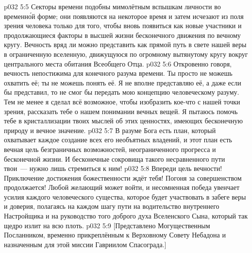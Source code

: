 \vs p032 5:5 Секторы времени подобны мимолётным вспышкам личности во временн\'ой форме; они появляются на некоторое время и затем исчезают из поля зрения человека только для того, чтобы вновь появиться как новые участники и продолжающиеся факторы в высшей жизни бесконечного движения по вечному кругу. Вечность вряд ли можно представить как прямой путь в свете нашей веры в ограниченную вселенную, движущуюся по огромному вытянутому кругу вокруг центрального места обитания Всеобщего Отца.
\vs p032 5:6 Откровенно говоря, вечность непостижима для конечного разума времени. Ты просто не можешь охватить её; ты не можешь понять её. Я не вполне представляю её, а даже если бы представил, то не смог бы передать мою концепцию человеческому разуму. Тем не менее я сделал всё возможное, чтобы изобразить кое-что с нашей точки зрения, рассказать тебе о нашем понимании вечных вещей. Я пытаюсь помочь тебе в кристаллизации твоих мыслей об этих ценностях, имеющих бесконечную природу и вечное значение.
\vs p032 5:7 \pc В разуме Бога есть план, который охватывает каждое создание всех его необъятных владений, и этот план есть вечная цель безграничных возможностей, неограниченного прогресса и бесконечной жизни. И бесконечные сокровища такого несравненного пути твои~--- нужно лишь стремиться к ним!
\vs p032 5:8 Впереди цель вечности! Приключение достижения божественности ждёт тебя! Погоня за совершенством продолжается! Любой желающий может войти, и несомненная победа увенчает усилия каждого человеческого существа, которое будет участвовать в забеге веры и доверия, полагаясь на каждом шагу пути на водительство внутреннего Настройщика и на руководство того доброго духа Вселенского Сына, который так щедро излит на всю плоть.
\vsetoff
\vs p032 5:9 [Представлено Могущественным Посланником, временно прикреплённым к Верховному Совету Небадона и назначенным для этой миссии Гавриилом Спасограда.]
\quizlink
